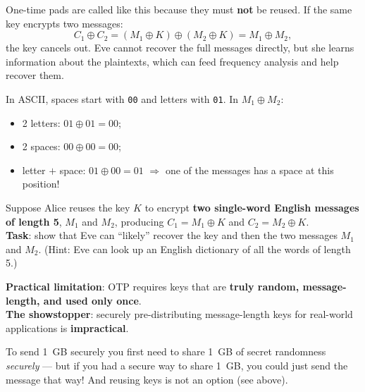 \begin{defnbox}[title={One-time: never reuse the key}]
One-time pads are called like this because they must \textbf{not} be reused. If the same
key encrypts two messages:
\[
  C_1 \oplus C_2 = (M_1 \oplus K) \oplus (M_2 \oplus K) = M_1 \oplus M_2 ,
\]
the key cancels out. Eve cannot recover the full messages directly, but she learns
information about the plaintexts, which can feed frequency analysis and help recover
them.
\end{defnbox}

\begin{exbox}[title=Spaces vs.\ letters in ASCII]
In ASCII, spaces start with \texttt{00} and letters with \texttt{01}. In $M_1 \oplus M_2$:
\begin{itemize}
  \item 2 letters: $01 \oplus 01 = 00$;
  \item 2 spaces: $00 \oplus 00 = 00$;
  \item letter $+$ space: $01 \oplus 00 = 01$ $\Rightarrow$ one of the messages has a
        space at this position!
\end{itemize}
\end{exbox}

\begin{exbox}[title={Exercise --- Key reuse}]
Suppose Alice reuses the key $K$ to encrypt \textbf{two single-word English messages of
length 5}, $M_1$ and $M_2$, producing $C_1 = M_1 \oplus K$ and $C_2 = M_2 \oplus K$. \\
\textbf{Task}: show that Eve can ``likely'' recover the key and then the two messages
$M_1$ and $M_2$. (Hint: Eve can look up an English dictionary of all the words of
length 5.)
\end{exbox}

\begin{defnbox}[title=The key problem of the OTP]
\textbf{Practical limitation}: OTP requires keys that are \textbf{truly random,
message-length, and used only once}. \\
\textbf{The showstopper}: securely pre-distributing message-length keys for real-world
applications is \textbf{impractical}.
\end{defnbox}

\begin{rembox}[title=Why is it a showstopper?]
To send 1~GB securely you first need to share 1~GB of secret randomness \emph{securely}
--- but if you had a secure way to share 1~GB, you could just send the message that way!
And reusing keys is not an option (see above).
\end{rembox}

